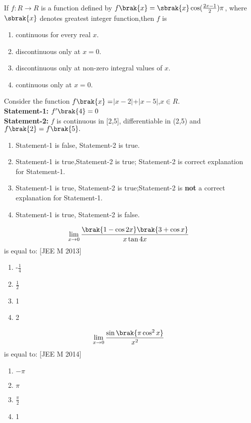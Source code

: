     \item If $f:R\to R$ is a function defined by $f\brak{x}=\sbrak{x} \cos (\frac{2x-1}{2})\pi$, where $\sbrak{x}$ denotes greatest integer function,then $f$ is \hfill{}
     \begin{enumerate}
     \item continuous for every real $x$. \item discontinuous only at $x=0$. \item discontinuous only at non-zero integral values of $x$. \item continuous only at $x=0$.
     \end{enumerate}
    \item Consider the function $f\brak{x}=$\(\lvert x-2\rvert\)+\(\lvert x-5\rvert\),$x\in R$.\\ \textbf{Statement-1:} $f'\brak{4}=0$\\ \textbf{Statement-2:} $f$ is continuous in [2,5], differentiable in (2,5) and $f\brak{2}=f\brak{5}.$ \hfill{}
     \begin{enumerate}
     \item Statement-1 is false, Statement-2 is true. \item Statement-1 is true,Statement-2 is true; Statement-2 is correct explanation for Statement-1. \item Statement-1 is true, Statement-2 is true;Statement-2 is \textbf{not} a correct explanation for Statement-1. \item Statement-1 is true, Statement-2 is false.
     \end{enumerate}
    \item 
        \[ \lim_{x \to 0} \frac{\brak{1-\cos2x}\brak{3+\cos x}}{x\tan4x} \]is equal to: \hfill[JEE M 2013]
     \begin{multicols}{4}
         \begin{enumerate}
     \item -$\frac{1}{4}$ \item $\frac{1}{2}$  \item1 \item2 
     \end{enumerate}
     \end{multicols}
     
    \item 
        \[ \lim_{x \to 0} \frac{\sin\brak{\pi\cos^{2}x}}{x^2}\] is equal to: \hfill[JEE M 2014]
     \begin{multicols}{4}
        \begin{enumerate}
     \item $-\pi$ \item $\pi$ \item $\frac{\pi}{2}$ \item 1 
     \end{enumerate} 
     \end{multicols}
     
